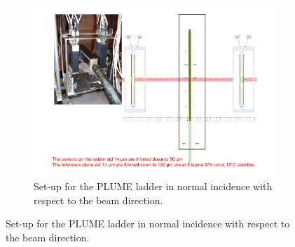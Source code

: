     \begin{figure}[!h]
      \centering
      \begin{subfigure}[t]{0.9\textwidth}
        \centering
        \includegraphics[width = 0.5 \textwidth]{Pictures/deformation/tb_cern_11_sketch_normal.pdf}
        \caption{Set-up for the PLUME ladder in normal incidence with respect to the beam direction.}
        \label{fig:tbNormal}
      \end{subfigure}


\end{figure}

